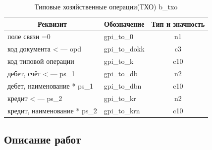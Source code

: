 \begin{table}[!htb]
    \centering
    \scriptsize
    \caption{Типовые хозяйственные операции(ТХО) \gpiFIO\/b\_txo}
    \begin{tabular}{|p{7cm}|p{7cm}|c|}

\hline
\multicolumn{1}{|c}{\textbf{Реквизит}}
&\multicolumn{1}{|c}{\textbf{Обозначение}}  
&\multicolumn{1}{|p{1.6cm}|}{\textbf{Тип и значность}} 
\\ \hline

поле связи =0                   &gpi\_to\_0             &n1                         \\ \hline
код документа < --- opd         &gpi\_to\_dokk          &c3                         \\ \hline
код типовой операции            &gpi\_to\_k             &c10                        \\ \hline
дебет, счёт < --- ps\_1         &gpi\_to\_db            &n2                         \\ \hline
дебет, наименование * ps\_1     &gpi\_to\_dbn           &c10                        \\ \hline
кредит < --- ps\_2              &gpi\_to\_kr            &n2                         \\ \hline
кредит, наименование * ps\_2    &gpi\_to\_krn           &c10                        \\ \hline

    \end{tabular}
\end{table}

\newpage

\subsection{Описание работ}

